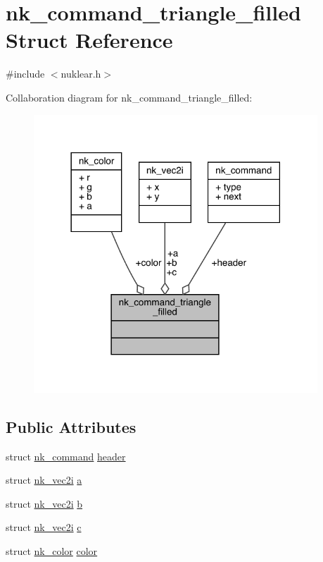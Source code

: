 \hypertarget{structnk__command__triangle__filled}{}\section{nk\+\_\+command\+\_\+triangle\+\_\+filled Struct Reference}
\label{structnk__command__triangle__filled}


{\ttfamily \#include $<$nuklear.\+h$>$}



Collaboration diagram for nk\+\_\+command\+\_\+triangle\+\_\+filled\+:
\nopagebreak
\begin{figure}[H]
\begin{center}
\leavevmode
\includegraphics[width=302pt]{structnk__command__triangle__filled__coll__graph}
\end{center}
\end{figure}
\subsection*{Public Attributes}
\begin{DoxyCompactItemize}
\item 
struct \mbox{\hyperlink{structnk__command}{nk\+\_\+command}} \mbox{\hyperlink{structnk__command__triangle__filled_aba10245834e42312409e2b46e89364c5}{header}}
\item 
struct \mbox{\hyperlink{structnk__vec2i}{nk\+\_\+vec2i}} \mbox{\hyperlink{structnk__command__triangle__filled_aca4ee3d0be539c944ee86758fa434cd4}{a}}
\item 
struct \mbox{\hyperlink{structnk__vec2i}{nk\+\_\+vec2i}} \mbox{\hyperlink{structnk__command__triangle__filled_a74a97afd25d3ca85f507f0fef6f7a3a7}{b}}
\item 
struct \mbox{\hyperlink{structnk__vec2i}{nk\+\_\+vec2i}} \mbox{\hyperlink{structnk__command__triangle__filled_a74aedb1be3f5af2aa0f11ec82fe25389}{c}}
\item 
struct \mbox{\hyperlink{structnk__color}{nk\+\_\+color}} \mbox{\hyperlink{structnk__command__triangle__filled_af1a8f938d6b75eafc0212ab4c5a1baf8}{color}}
\end{DoxyCompactItemize}


